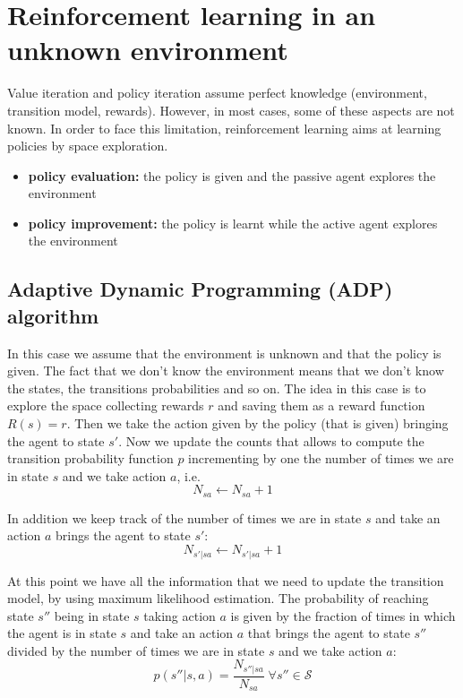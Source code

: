\section{Reinforcement learning in an unknown environment}

Value iteration and policy iteration assume perfect knowledge (environment, transition model, rewards). However, in most cases, some of these aspects are not known. In order to face this limitation, reinforcement learning aims at learning policies by space exploration.
\begin{itemize}
    \item \textbf{policy evaluation:} the policy is given and the passive agent explores the environment
    \item \textbf{policy improvement:} the policy is learnt while the active agent explores the environment
\end{itemize}

\subsection{Adaptive Dynamic Programming (ADP) algorithm}
In this case we assume that the environment is unknown and that the policy is given. The fact that we don't know the environment means that we don't know the states, the transitions probabilities and so on. The idea in this case is to explore the space collecting rewards $r$ and saving them as a reward function $R(s)=r$. Then we take the action given by the policy (that is given) bringing the agent to state $s'$. Now we update the counts that allows to compute the transition probability function $p$ incrementing by one the number of times we are in state $s$ and we take action $a$, i.e.
\begin{equation}
    N_{sa} \leftarrow N_{sa}+1    
\end{equation}

In addition we keep track of the number of times we are in state $s$ and take an action $a$ brings the agent to state $s'$:
\begin{equation}
    N_{s'|sa} \leftarrow N_{s'|sa}+1
\end{equation}

At this point we have all the information that we need to update the transition model, by using maximum likelihood estimation. The probability of reaching state $s''$ being in state $s$ taking action $a$ is given by the fraction of times in which the agent is in state $s$ and take an action $a$ that brings the agent to state $s''$ divided by the number of times we are in state $s$ and we take action $a$:
\begin{equation}
    p(s''|s,a) = \frac{N_{s''|sa}}{N_{sa}} \; \forall s'' \in \mathcal{S}
\end{equation}

